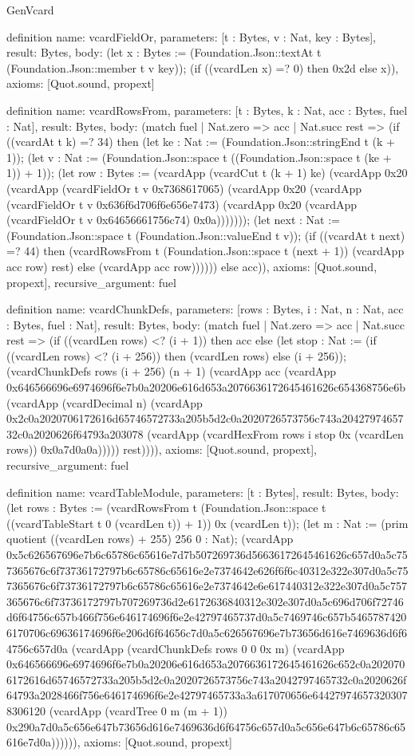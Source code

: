 \begin{lexlean}{GenVcard}
\begin{semanticmodule}
definition{
  name: vcardFieldOr,
  parameters: [t : Bytes, v : Nat, key : Bytes],
  result: Bytes,
  body: (let x : Bytes := (Foundation.Json::textAt t (Foundation.Json::member t v key)); (if ((vcardLen x) =? 0) then 0x2d else x)),
  axioms: [Quot.sound, propext]
}

definition{
  name: vcardRowsFrom,
  parameters: [t : Bytes, k : Nat, acc : Bytes, fuel : Nat],
  result: Bytes,
  body: (match fuel
    | Nat.zero => acc
    | Nat.succ rest => (if ((vcardAt t k) =? 34) then (let ke : Nat := (Foundation.Json::stringEnd t (k + 1)); (let v : Nat := (Foundation.Json::space t ((Foundation.Json::space t (ke + 1)) + 1)); (let row : Bytes := (vcardApp (vcardCut t (k + 1) ke) (vcardApp 0x20 (vcardApp (vcardFieldOr t v 0x7368617065) (vcardApp 0x20 (vcardApp (vcardFieldOr t v 0x636f6d706f6e656e7473) (vcardApp 0x20 (vcardApp (vcardFieldOr t v 0x64656661756c74) 0x0a))))))); (let next : Nat := (Foundation.Json::space t (Foundation.Json::valueEnd t v)); (if ((vcardAt t next) =? 44) then (vcardRowsFrom t (Foundation.Json::space t (next + 1)) (vcardApp acc row) rest) else (vcardApp acc row)))))) else acc)),
  axioms: [Quot.sound, propext],
  recursive_argument: fuel
}

definition{
  name: vcardChunkDefs,
  parameters: [rows : Bytes, i : Nat, n : Nat, acc : Bytes, fuel : Nat],
  result: Bytes,
  body: (match fuel
    | Nat.zero => acc
    | Nat.succ rest => (if ((vcardLen rows) <? (i + 1)) then acc else (let stop : Nat := (if ((vcardLen rows) <? (i + 256)) then (vcardLen rows) else (i + 256)); (vcardChunkDefs rows (i + 256) (n + 1) (vcardApp acc (vcardApp 0x646566696e6974696f6e7b0a20206e616d653a2076636172645461626c654368756e6b (vcardApp (vcardDecimal n) (vcardApp 0x2c0a2020706172616d65746572733a205b5d2c0a2020726573756c743a2042797465732c0a2020626f64793a203078 (vcardApp (vcardHexFrom rows i stop 0x (vcardLen rows)) 0x0a7d0a0a))))) rest)))),
  axioms: [Quot.sound, propext],
  recursive_argument: fuel
}

definition{
  name: vcardTableModule,
  parameters: [t : Bytes],
  result: Bytes,
  body: (let rows : Bytes := (vcardRowsFrom t (Foundation.Json::space t ((vcardTableStart t 0 (vcardLen t)) + 1)) 0x (vcardLen t)); (let m : Nat := (prim quotient ((vcardLen rows) + 255) 256 0 : Nat); (vcardApp 0x5c626567696e7b6c65786c65616e7d7b507269736d56636172645461626c657d0a5c757365676c6f73736172797b6c65786c65616e2e7374642e626f6f6c40312e322e307d0a5c757365676c6f73736172797b6c65786c65616e2e7374642e6e617440312e322e307d0a5c757365676c6f73736172797b707269736d2e6172636840312e302e307d0a5c696d706f72746d6f64756c657b466f756e646174696f6e2e42797465737d0a5c7469746c657b54657874206170706c69636174696f6e206d6f64656c7d0a5c626567696e7b73656d616e7469636d6f64756c657d0a (vcardApp (vcardChunkDefs rows 0 0 0x m) (vcardApp 0x646566696e6974696f6e7b0a20206e616d653a2076636172645461626c652c0a2020706172616d65746572733a205b5d2c0a2020726573756c743a2042797465732c0a2020626f64793a2028466f756e646174696f6e2e42797465733a3a617070656e644279746573203078306120 (vcardApp (vcardTree 0 m (m + 1)) 0x290a7d0a5c656e647b73656d616e7469636d6f64756c657d0a5c656e647b6c65786c65616e7d0a)))))),
  axioms: [Quot.sound, propext]
}


\end{semanticmodule}
\end{lexlean}
